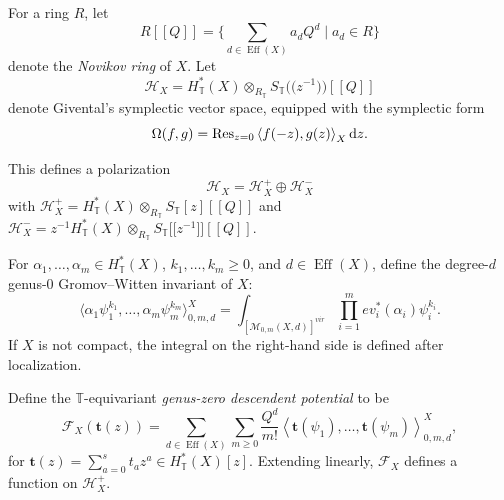 \documentclass[pdftex]{sigma}
\numberwithin{equation}{section}
\newcommand{\cc}[1]{\mathcal{#1}} %
\newcommand{\bt}{{\bm{t}}}
\newcommand{\torus}{\mathbb{T}}
\DeclareMathOperator{\eff}{Eff}
\newcommand{\br}[1]{\left\langle#1\right\rangle} %
\newcommand{\op}[1]{\operatorname{#1}}
\begin{document}
For a ring $R$, let
\[
R[\![Q]\!] = \biggl\{ \sum_{d\in \eff(X)} a_d Q^d \mid a_d \in R \biggr\}
\]
denote the \emph{Novikov ring} of $X$.
Let
\[
\cc H_X = H^*_\torus(X) \otimes_{R_\torus} S_\torus\bigl(\!\bigl(z^{-1}\bigr)\!\bigr)[\![Q]\!]
\]
denote Givental's symplectic vector space, equipped with the symplectic form
\begin{equation*}%
\Omega(f, g) = \op{Res}_{z = 0}\br{f(-z), g(z)}_X {\rm d}z.
\end{equation*}


This defines a polarization
\[
\cc H_X = \cc H_X^+ \oplus \cc H_X^-
\]
with $\cc H_X^+ = H^*_\torus(X) \otimes_{R_\torus} S_\torus[z][\![Q]\!]$ and
$\cc H_X^- = z^{-1} H^*_\torus(X) \otimes_{R_\torus} S_\torus \bigl[\!\bigl[z^{-1}\bigr]\!\bigr] [\![Q]\!]$.

For $\alpha_1, \dots, \alpha_m \in H^*_\torus(X)$, $k_1, \dots, k_m \geq 0$, and $d \in \eff(X)$, define the degree-$d$ genus-0 Gromov--Witten invariant of $X$:
\[
\big\langle\alpha_1 \psi_1^{k_1}, \dots, \alpha_m \psi_m^{k_m}\bigr\rangle_{0, m ,d}^X = \int_{[\cc M_{0, m}(X, d)]^{vir}} \prod_{i=1}^m ev_i^*(\alpha_i) \psi_i^{k_i}.
\]
If $X$ is not compact, the integral on the right-hand side is defined after localization.
\begin{Definition}
Define the $\torus$-equivariant \emph{genus-zero descendent potential} to be
\begin{equation*}
\cc F_X(\bt(z)) = \sum_{d \in \eff(X)} \sum_{m \geq 0} \frac{Q^d}{m!} \br{\bt(\psi_1), \dots, \bt(\psi_m)}_{0, m, d}^X,
\end{equation*}
for $\bt(z) = \sum_{a=0}^s t_a z^a \in H^*_\torus(X)[z]$. Extending linearly, $\cc F_X$ defines a function on $\cc H_X^+$.
\end{Definition}
\end{document}
